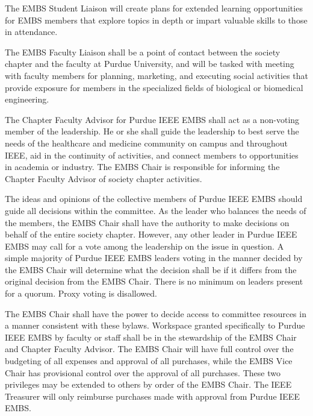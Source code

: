 \documentclass[12pt]{constitution}
\begin{document}
The EMBS Student Liaison will create plans for extended learning opportunities for EMBS members that explore topics in depth or impart valuable skills to those in attendance. 

The EMBS Faculty Liaison shall be a point of contact between the society chapter and the faculty at Purdue University, and will be tasked with meeting with faculty members for planning, marketing, and executing social activities that provide exposure for members in the specialized fields of biological or biomedical engineering.

The Chapter Faculty Advisor for Purdue IEEE EMBS shall act as a non-voting member of the leadership. He or she shall guide the leadership to best serve the needs of the healthcare and medicine community on campus and throughout IEEE, aid in the continuity of activities, and connect members to opportunities in academia or industry. The EMBS Chair is responsible for informing the Chapter Faculty Advisor of society chapter activities.


\label{art:decide}

The ideas and opinions of the collective members of Purdue IEEE EMBS should guide all decisions within the committee. As the leader who balances the needs of the members, the EMBS Chair shall have the authority to make decisions on behalf of the entire society chapter. However, any other leader in Purdue IEEE EMBS may call for a vote among the leadership on the issue in question. A simple majority of Purdue IEEE EMBS leaders voting in the manner decided by the EMBS Chair will determine what the decision shall be if it differs from the original decision from the EMBS Chair. There is no minimum on leaders present for a quorum. Proxy voting is disallowed.

The EMBS Chair shall have the power to decide access to committee resources in a manner consistent with these bylaws. Workspace granted specifically to Purdue IEEE EMBS by faculty or staff shall be in the stewardship of the EMBS Chair and Chapter Faculty Advisor. The EMBS Chair will have full control over the budgeting of all expenses and approval of all purchases, while the EMBS Vice Chair has provisional control over the approval of all purchases. These two privileges may be extended to others by order of the EMBS Chair. The IEEE Treasurer will only reimburse purchases made with approval from Purdue IEEE EMBS.
\end{document}
